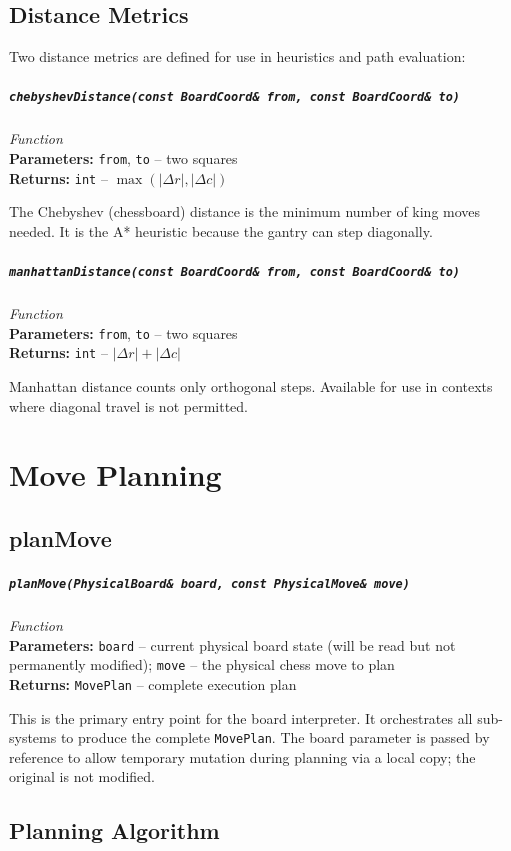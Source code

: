 \documentclass[11pt,a4paper]{report}
\newcommand{\function}[4]{%
    \paragraph{\texttt{#1}} \hfill \textit{#2}\\
    \textbf{Parameters:} #3\\
    \textbf{Returns:} #4
}
\begin{document}
\section{Distance Metrics}

Two distance metrics are defined for use in heuristics and path evaluation:

\function{chebyshevDistance(const BoardCoord\& from, const BoardCoord\& to)}{Function}{\texttt{from}, \texttt{to} -- two squares}{\texttt{int} -- $\max(|\Delta r|, |\Delta c|)$}

The Chebyshev (chessboard) distance is the minimum number of king moves needed. It is the A* heuristic because the gantry can step diagonally.

\function{manhattanDistance(const BoardCoord\& from, const BoardCoord\& to)}{Function}{\texttt{from}, \texttt{to} -- two squares}{\texttt{int} -- $|\Delta r| + |\Delta c|$}

Manhattan distance counts only orthogonal steps. Available for use in contexts where diagonal travel is not permitted.

\chapter{Move Planning}

\section{planMove}

\function{planMove(PhysicalBoard\& board, const PhysicalMove\& move)}{Function}{\texttt{board} -- current physical board state (will be read but not permanently modified); \texttt{move} -- the physical chess move to plan}{\texttt{MovePlan} -- complete execution plan}

This is the primary entry point for the board interpreter. It orchestrates all sub-systems to produce the complete \texttt{MovePlan}. The board parameter is passed by reference to allow temporary mutation during planning via a local copy; the original is not modified.

\section{Planning Algorithm}
\end{document}
